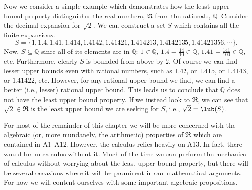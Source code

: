 Now we consider a simple example which demonstrates
how the least upper bound property distinguishes the real
numbers, $\Re$ from the rationals, $\mathbb{Q}$. 
Consider the decimal expansion for $\sqrt2$.
We can construct a set $S$ which contains all the
finite expansions:
$$S=\{1, 1.4, 1.41, 1.414, 1.4142, 1.41421,
1.414213, 1.4142135, 1.41421356, \cdots\}.$$
Now, $S\subseteq\mathbb{Q}$ since all of its elements are in $\mathbb{Q}$:
$1\in\mathbb{Q}$,  
$1.4=\frac{14}{10}\in\mathbb{Q}$, $1.41=\frac{141}{100}
\in\mathbb{Q}$, etc.
Furthermore, clearly $S$ is bounded from above by $2$.
Of course we can find  lesser upper bounds even with rational numbers, 
such as $1.42$, or $1.415$, or $1.4143$, or $1.41422$, etc.
However, for any rational upper bound we find, we can find a better
(i.e., lesser) rational upper bound. This leads us to
conclude that $\mathbb{Q}$ does not
have the least upper bound property.  If we instead look to 
$\Re$, we can see that $\sqrt2\in\Re$ is the least upper bound
we are seeking for $S$, i.e., $\sqrt2=\lub(S)$.\footnotemark
{}   

For most of the remainder of this chapter we will be more
concerned with the algebraic (or, more mundanely, the
arithmetic) properties of $\Re$ which are contained in
A1--A12.  However, the calculus relies heavily on A13.
In fact, there would be no calculus without it.
Much of the time we can perform the mechanics of calculus
without worrying about the least upper bound property,
but there will be several occasions where it will be 
prominent in our mathematical arguments.
For now we will content ourselves with some important
 algebraic propositions.







